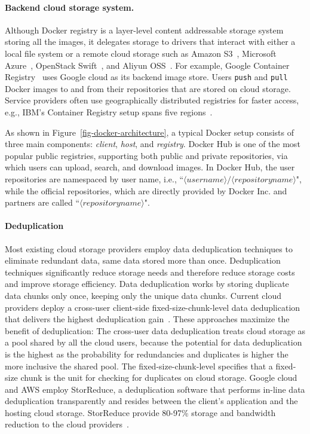 \paragraph{Backend cloud storage system.} Although Docker registry
is a layer-level content addressable storage system storing all the images, it
delegates storage to drivers that interact with either a local file system or a
remote cloud storage such as Amazon S3~\cite{s3}, Microsoft Azure~\cite{azure},
OpenStack Swift~\cite{swift}, and Aliyun OSS~\cite{aliyun}.  For example,
Google Container Registry~\cite{GoogleContainerRegistry} uses Google cloud as
its backend image store.  Users \texttt{push} and \texttt{pull} Docker images
to and from their repositories that are stored on cloud storage. 
Service providers often use geographically
distributed registries for faster access, e.g., IBM's Container Registry setup
spans five regions~\cite{dockerworkload}. 

 As shown in
Figure~\ref{fig-docker-architecture}, a typical Docker setup consists of three
main components: \emph{client}, \emph{host}, and \emph{registry}.  Docker Hub
is one of the most popular public registries, supporting both public and
private repositories, via which users can upload, search, and download images.
In Docker Hub, the user repositories are namespaced by user name, i.e.,
``$\langle username\rangle/\langle repository name \rangle$", while the
official repositories, which are directly provided by Docker Inc. and partners
are called ``$\langle repository name \rangle$".   


\paragraph{Deduplication}
Most existing cloud storage
providers employ data deduplication techniques to eliminate redundant data,
same data stored more than once.  Deduplication techniques significantly reduce
storage needs and therefore reduce storage costs and improve storage
efficiency.  Data deduplication works by storing duplicate data chunks only
once, keeping only the unique data chunks. 
Current cloud providers deploy a
cross-user client-side fixed-size-chunk-level data deduplication that delivers
the highest deduplication gain~\cite{pooranian2018rare}.  These approaches
maximize the benefit of deduplication: The cross-user data deduplication treats
cloud storage as a pool shared by all the cloud users, because the potential
for data deduplication is the highest as the probability for redundancies and
duplicates is higher the more inclusive the shared pool.  The
fixed-size-chunk-level specifies that a fixed-size chunk is the unit for
checking for duplicates on cloud storage.  Google cloud and AWS employ
StorReduce, a deduplication software that performs in-line data deduplication
transparently and resides between the client's application and the hosting
cloud storage. StorReduce provide 80-97\% storage and bandwidth reduction to
the cloud providers~\cite{StorReduce_google}.  


